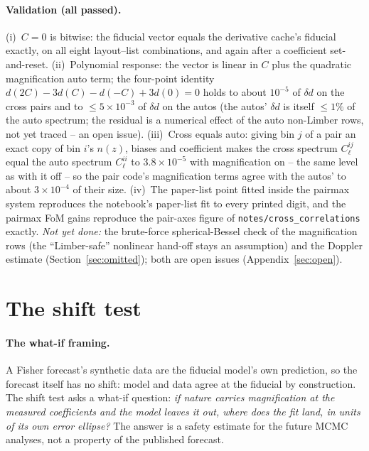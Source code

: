 \documentclass[11pt]{article}
\newcommand{\us}{\_\allowbreak}
\begin{document}
\paragraph{Validation (all passed).}
(i)~$C = 0$ is bitwise: the fiducial vector equals the derivative
cache's fiducial exactly, on all eight layout--list combinations,
and again after a coefficient set-and-reset.  (ii)~Polynomial
response: the vector is linear in $C$ plus the quadratic
magnification auto term; the four-point identity
$d(2C) - 3d(C) - d(-C) + 3d(0) = 0$ holds to about $10^{-5}$ of
$\delta d$ on the cross pairs and to $\le 5\times10^{-3}$ of
$\delta d$ on the autos (the autos' $\delta d$ is itself $\le 1\%$
of the auto spectrum; the residual is a numerical effect of the auto
non-Limber rows, not yet traced -- an open issue).
(iii)~Cross equals auto: giving bin $j$ of a pair an exact copy of
bin $i$'s $n(z)$, biases and coefficient makes the cross spectrum
$C_\ell^{ij}$ equal the auto spectrum
$C_\ell^{ii}$ to $3.8\times10^{-5}$ with magnification on -- the same
level as with it off -- so the pair code's magnification terms agree
with the autos' to about $3\times10^{-4}$ of their size.
(iv)~The paper-list point fitted inside the pairmax system
reproduces the notebook's paper-list fit to every printed digit, and
the pairmax FoM gains reproduce the pair-axes figure of
\texttt{notes/cross\us correlations} exactly.  \emph{Not yet done:}
the brute-force spherical-Bessel check of the magnification rows
(the ``Limber-safe'' nonlinear hand-off stays an assumption) and the
Doppler estimate
(Section~\ref{sec:omitted}); both are open issues
(Appendix~\ref{sec:open}).

\section{The shift test}
\label{sec:shift}

\paragraph{The what-if framing.}
A Fisher forecast's synthetic data are the fiducial model's own
prediction, so the forecast itself has no shift: model and data agree
at the fiducial by construction.  The shift test asks a what-if
question: \emph{if nature carries magnification at the measured
coefficients and the model leaves it out, where does the fit land, in
units of its own error ellipse?}  The answer is a safety estimate for
the future MCMC analyses, not a property of the published forecast.
\end{document}
